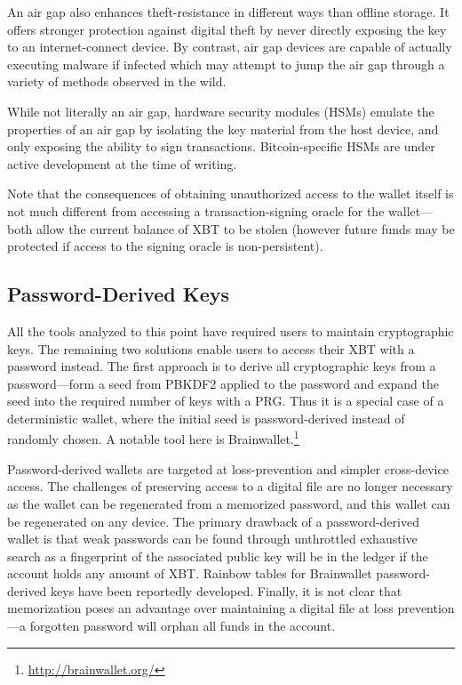 An air gap also enhances theft-resistance in different ways than offline storage. It offers stronger protection against digital theft by never directly exposing the key to an internet-connect device. By contrast, air gap devices are capable of actually executing malware if infected which may attempt to jump the air gap through a variety of methods observed in the wild.

While not literally an air gap, hardware security modules (HSMs) emulate the properties of an air gap by isolating the key material from the host device, and only exposing the ability to sign transactions. Bitcoin-specific HSMs are under active development at the time of writing.

Note that the consequences of obtaining unauthorized access to the wallet itself is not much different from accessing a transaction-signing oracle for the wallet---both allow the current balance of XBT to be stolen (however future funds may be protected if access to the signing oracle is non-persistent). 


\subsection{Password-Derived Keys} 

All the tools analyzed to this point have required users to maintain cryptographic keys. The remaining two solutions enable users to access their XBT with a password instead. The first approach is to derive all cryptographic keys from a password---\eg form a seed from PBKDF2 applied to the password and expand the seed into the required number of keys with a PRG. Thus it is a special case of a deterministic wallet, where the initial seed is password-derived instead of randomly chosen. A notable tool here is Brainwallet.\footnote{\url{http://brainwallet.org/}}

Password-derived wallets are targeted at loss-prevention and simpler cross-device access. The challenges of preserving access to a digital file are no longer necessary as the wallet can be regenerated from a memorized password, and this wallet can be regenerated on any device. The primary drawback of a password-derived wallet is that weak passwords can be found through unthrottled exhaustive search as a fingerprint of the associated public key will be in the ledger if the account holds any amount of XBT. Rainbow tables for Brainwallet password-derived keys have been reportedly developed. Finally, it is not clear that memorization poses an advantage over maintaining a digital file at loss prevention---a forgotten password will orphan all funds in the account.



